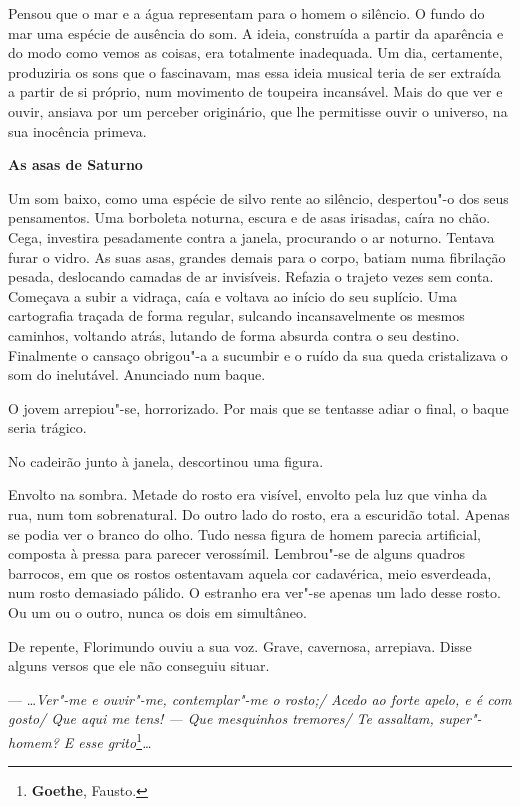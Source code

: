 Pensou que o mar e a água representam para o homem o silêncio. O fundo
do mar uma espécie de ausência do som. A ideia, construída a partir da
aparência e do modo como vemos as coisas, era totalmente inadequada. Um
dia, certamente, produziria os sons que o fascinavam, mas essa ideia
musical teria de ser extraída a partir de si próprio, num movimento de
toupeira incansável. Mais do que ver e ouvir, ansiava por um perceber
originário, que lhe permitisse ouvir o universo, na sua inocência
primeva.

\vspace*{1.8cm}
\noindent{}\textbf{As asas de Saturno}

\bigskip

Um som baixo, como uma espécie de silvo rente ao silêncio, despertou"-o
dos seus pensamentos. Uma borboleta noturna, escura e de asas irisadas,
caíra no chão. Cega, investira pesadamente contra a janela, procurando o
ar noturno. Tentava furar o vidro. As suas asas, grandes demais para o
corpo, batiam numa fibrilação pesada, deslocando camadas de ar
invisíveis. Refazia o trajeto vezes sem conta. Começava a subir a
vidraça, caía e voltava ao início do seu suplício. Uma cartografia
traçada de forma regular, sulcando incansavelmente os mesmos caminhos,
voltando atrás, lutando de forma absurda contra o seu destino.
Finalmente o cansaço obrigou"-a a sucumbir e o ruído da sua queda
cristalizava o som do inelutável. Anunciado num baque.

O jovem arrepiou"-se, horrorizado. Por mais que se tentasse adiar o
final, o baque seria trágico.

No cadeirão junto à janela, descortinou uma figura.

Envolto na sombra. Metade do rosto era visível, envolto pela luz que
vinha da rua, num tom sobrenatural. Do outro lado do rosto, era a
escuridão total. Apenas se podia ver o branco do olho. Tudo nessa figura
de homem parecia artificial, composta à pressa para parecer verossímil.
Lembrou"-se de alguns quadros barrocos, em que os rostos ostentavam
aquela cor cadavérica, meio esverdeada, num rosto demasiado pálido. O
estranho era ver"-se apenas um lado desse rosto. Ou um ou o outro, nunca
os dois em simultâneo.

De repente, Florimundo ouviu a sua voz. Grave, cavernosa, arrepiava.
Disse alguns versos que ele não conseguiu situar.

--- \ldots{}\emph{Ver"-me e ouvir"-me, contemplar"-me o rosto;/ Acedo ao forte
apelo, e é com gosto/ Que aqui me tens! --- Que mesquinhos tremores/ Te
assaltam, super"-homem? E esse grito}\footnote{\textbf{Goethe},
  Fausto. }\emph{\ldots{}}

